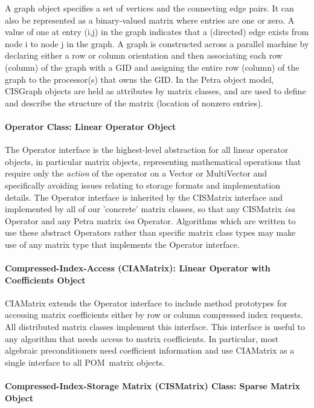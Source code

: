 \documentclass[10pt,relax]{PetraObjectModel}
\newcommand{\POM}{POM}
\begin{document}
A graph object specifies a set of vertices and the connecting edge
pairs.  It can also be represented as a binary-valued matrix where
entries are one or zero.  A value of one at entry (i,j) in the graph
indicates that a (directed) edge exists from node i to node j in the
graph.  A graph is constructed across a parallel machine by
declaring either a row or column orientation and then associating
each row (column) of the graph with a GID and assigning the entire
row (column) of the graph to the processor(s) that owns the GID. In
the Petra object model, CISGraph objects are held as attributes by
matrix classes, and are used to define and describe the structure of
the matrix (location of nonzero entries).

\paragraph{Operator Class: Linear Operator Object}

The Operator interface is the highest-level abstraction for all
linear operator objects, in particular matrix objects, representing
mathematical operations that require only the \textit{action} of the
operator on a Vector or MultiVector and specifically avoiding issues
relating to storage formats and implementation details. The Operator
interface is inherited by the CISMatrix interface and implemented by
all of our 'concrete' matrix classes, so that any CISMatrix
\textit{isa} Operator and any Petra matrix \textit{isa} Operator.
Algorithms which are written to use these abstract Operators rather
than specific matrix class types may make use of any matrix type
that implements the Operator interface.

\paragraph{Compressed-Index-Access (CIAMatrix): Linear Operator with Coefficients Object}

CIAMatrix extends the Operator interface to include method
prototypes for accessing matrix coefficients either by row or column
compressed index requests.  All distributed matrix classes implement
this interface.  This interface is useful to any algorithm that
needs access to matrix coefficients.  In particular, most algebraic
preconditioners need coefficient information and use CIAMatrix as a
single interface to all \POM\ matrix objects.

\paragraph{Compressed-Index-Storage Matrix (CISMatrix) Class: Sparse Matrix Object}
\end{document}
